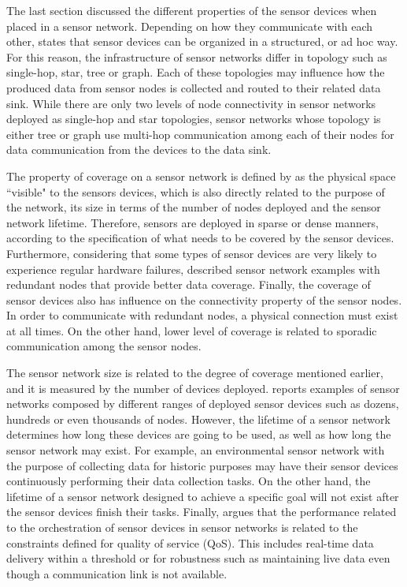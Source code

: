 The last section discussed the different properties of the sensor devices when
placed in a sensor network. Depending on how they communicate with each other,
\cite{sn-intro02} states that sensor devices can be organized in a
structured, or ad hoc way. For this reason, the infrastructure of sensor
networks differ in topology such as single-hop, star, tree or  graph. Each of
these topologies may influence how the produced data from sensor nodes is
collected and routed to their related data sink. While there are only two
levels of node connectivity in sensor networks deployed as single-hop and
star topologies, sensor networks whose topology is either tree or graph use
multi-hop communication among each of their nodes for data communication from
the devices to the data sink.

The property of coverage on a sensor network is defined by
\cite{sn-intro01} as the physical space ``visible" to the sensors devices, which
is also directly related to the purpose of the network, its size in terms of
the number of nodes deployed and the sensor network lifetime. Therefore,
sensors are deployed in sparse or dense manners, according to the
specification of what needs to be covered by the sensor devices. Furthermore,
considering that some types of sensor devices are very likely to experience regular
hardware failures, \cite{sn-intro02} described sensor network examples with 
redundant nodes that provide better data coverage.
Finally, the coverage of sensor devices also has influence on the connectivity
property of the sensor nodes. In order to communicate with redundant nodes, a
physical connection must exist at all times. On the other hand, lower
level of coverage is related to sporadic communication among the sensor nodes.

The sensor network size is related to the degree of coverage mentioned earlier,
and it is measured by the number of devices deployed. \cite{sn-intro01}
reports examples of sensor networks composed by different ranges of deployed
sensor devices such as dozens, hundreds or even thousands of nodes. However,
the lifetime of a sensor network determines how long these devices are going
to be used, as well as how long the sensor network may exist. For example, an
environmental sensor network \cite{sn-ex01} with the purpose of collecting data
for historic purposes may have their sensor devices continuously performing
their data collection tasks. On the other hand, the lifetime of a
sensor network designed to achieve a specific goal will not exist after the sensor
devices finish their tasks. Finally, \cite{sn-intro02} argues that the
performance related to the orchestration of sensor devices in sensor networks
is related to the constraints defined for quality of service (QoS).  This includes
real-time data delivery within a threshold or for robustness such as
maintaining live data even though a communication link is not available.

